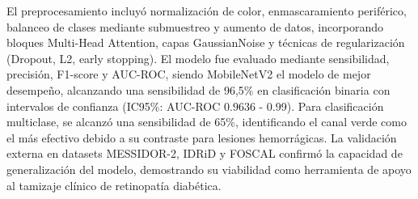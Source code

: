 {\begin{description}
          El preprocesamiento incluyó normalización de color, enmascaramiento periférico, balanceo de 
          clases mediante submuestreo y aumento de datos, incorporando bloques Multi-Head Attention, 
          capas GaussianNoise y técnicas de regularización (Dropout, L2, early stopping). El modelo 
          fue evaluado mediante sensibilidad, precisión, F1-score y AUC-ROC, siendo MobileNetV2 el 
          modelo de mejor desempeño, alcanzando una sensibilidad de 96,5\% en clasificación binaria 
          con intervalos de confianza (IC95\%: AUC-ROC 0.9636 - 0.99). Para clasificación multiclase,
          se alcanzó una sensibilidad de 65\%, identificando el canal verde como el más efectivo debido
          a su contraste para lesiones hemorrágicas. La validación externa en datasets MESSIDOR-2, 
          IDRiD y FOSCAL confirmó la capacidad de generalización del modelo, demostrando su viabilidad 
          como herramienta de apoyo al tamizaje clínico de retinopatía diabética.      
  \end{description}}\normalsize
